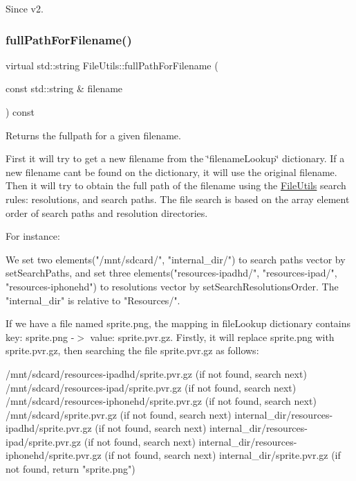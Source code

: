 \begin{DoxySince}{Since}
v2. 
\end{DoxySince}
\mbox{\label{classFileUtils_a06e56ef12b5ec5c7d11c138484f111bf}} 
\subsubsection{\texorpdfstring{full\+Path\+For\+Filename()}{fullPathForFilename()}\hspace{0.1cm}{\footnotesize\ttfamily [2/2]}}
{\footnotesize\ttfamily virtual std\+::string File\+Utils\+::full\+Path\+For\+Filename (\begin{DoxyParamCaption}\item[{const std\+::string \&}]{filename }\end{DoxyParamCaption}) const\hspace{0.3cm}{\ttfamily [virtual]}}

Returns the fullpath for a given filename.

First it will try to get a new filename from the \char`\"{}filename\+Lookup\char`\"{} dictionary. If a new filename can\textquotesingle{}t be found on the dictionary, it will use the original filename. Then it will try to obtain the full path of the filename using the \hyperlink{classFileUtils}{File\+Utils} search rules\+: resolutions, and search paths. The file search is based on the array element order of search paths and resolution directories.

For instance\+: \begin{DoxyVerb}We set two elements("/mnt/sdcard/", "internal_dir/") to search paths vector by setSearchPaths,
and set three elements("resources-ipadhd/", "resources-ipad/", "resources-iphonehd")
to resolutions vector by setSearchResolutionsOrder. The "internal_dir" is relative to "Resources/".
\end{DoxyVerb}


If we have a file named \textquotesingle{}sprite.\+png\textquotesingle{}, the mapping in file\+Lookup dictionary contains {\ttfamily key\+: sprite.\+png -\/$>$ value\+: sprite.\+pvr.\+gz}. Firstly, it will replace \textquotesingle{}sprite.\+png\textquotesingle{} with \textquotesingle{}sprite.\+pvr.\+gz\textquotesingle{}, then searching the file sprite.\+pvr.\+gz as follows\+: \begin{DoxyVerb}/mnt/sdcard/resources-ipadhd/sprite.pvr.gz      (if not found, search next)
/mnt/sdcard/resources-ipad/sprite.pvr.gz        (if not found, search next)
/mnt/sdcard/resources-iphonehd/sprite.pvr.gz    (if not found, search next)
/mnt/sdcard/sprite.pvr.gz                       (if not found, search next)
internal_dir/resources-ipadhd/sprite.pvr.gz     (if not found, search next)
internal_dir/resources-ipad/sprite.pvr.gz       (if not found, search next)
internal_dir/resources-iphonehd/sprite.pvr.gz   (if not found, search next)
internal_dir/sprite.pvr.gz                      (if not found, return "sprite.png")
\end{DoxyVerb}


